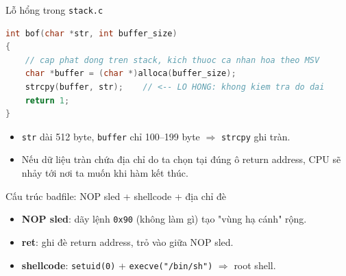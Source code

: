 \documentclass[aspectratio=169,10pt]{beamer}
\begin{document}
\begin{frame}[fragile]{Lỗ hổng trong \texttt{stack.c}}
\begin{lstlisting}[language=C]
int bof(char *str, int buffer_size)
{
    // cap phat dong tren stack, kich thuoc ca nhan hoa theo MSV
    char *buffer = (char *)alloca(buffer_size);
    strcpy(buffer, str);    // <-- LO HONG: khong kiem tra do dai
    return 1;
}
\end{lstlisting}
  \begin{itemize}
    \item \texttt{str} dài 512 byte, \texttt{buffer} chỉ 100--199 byte
          $\Rightarrow$ \texttt{strcpy} ghi tràn.
    \item Nếu dữ liệu tràn chứa địa chỉ do ta chọn tại đúng ô return address,
          CPU sẽ nhảy tới nơi ta muốn khi hàm kết thúc.
  \end{itemize}
\end{frame}

\begin{frame}{Cấu trúc badfile: NOP sled + shellcode + địa chỉ đè}
  \centering
  \vspace{0.6cm}
  \begin{itemize}\footnotesize
    \item \textbf{NOP sled}: dãy lệnh \texttt{0x90} (không làm gì) tạo "vùng hạ cánh" rộng.
    \item \textbf{ret}: ghi đè return address, trỏ vào giữa NOP sled.
    \item \textbf{shellcode}: \texttt{setuid(0)} + \texttt{execve("/bin/sh")} $\Rightarrow$ root shell.
  \end{itemize}
\end{frame}
\end{document}
